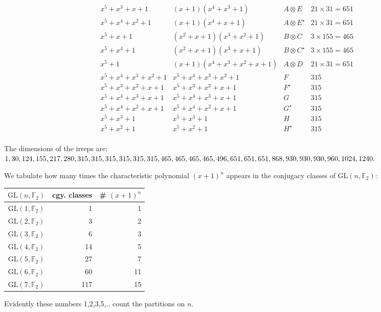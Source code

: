 \documentclass[11pt,oneside]{article}
\newcommand{\GL}{\mathrm{GL}}
\newcommand{\Field}{\mathbb{F}}
\newcommand{\tensor}{\otimes}
\begin{document}
$$\begin{array}{ccccr}
    &               x^5+x^3+x+1 &       (x+1)(x^4+x^3+1)  & A\tensor E                   &  21\times 31=651   \\
    &             x^5+x^4+x^2+1 &         (x+1)(x^4+x+1)  & A\tensor E^{\star}           &  21\times 31=651   \\
    &                   x^5+x+1 &   (x^2+x+1)(x^3+x^2+1)  & B\tensor C                   &  3\times 155=465   \\
    &                 x^5+x^4+1 &     (x^2+x+1)(x^3+x+1)  & B\tensor C^{\star}           &  3\times 155=465   \\
    &                     x^5+1 & (x+1)(x^4+x^3+x^2+x+1)  & A\tensor D                   &  21\times 31=651   \\
    &         x^5+x^4+x^3+x^2+1 &       x^5+x^4+x^3+x^2+1 & F                            & 315   \\
    &           x^5+x^3+x^2+x+1 &         x^5+x^3+x^2+x+1 & F^{\star}                    & 315   \\
    &           x^5+x^4+x^3+x+1 &         x^5+x^4+x^3+x+1 & G                            & 315   \\
    &           x^5+x^4+x^2+x+1 &         x^5+x^4+x^2+x+1 & G^{\star}                    & 315   \\
    &                 x^5+x^3+1 &               x^5+x^3+1 & H                            & 315   \\
    &                 x^5+x^2+1 &               x^5+x^2+1 & H^{\star}                    & 315   \\
\end{array}
$$

The dimensions of the irreps are:
$
1, 30, 124, 155, 217,
280, 
315, 315, 315, 315, 315, 315,\\
465, 465, 
465, 465, 
496, 
651, 651, 651, 868, 
930, 930, 930, 
960, 1024, 1240.
$

We tabulate how many times the characteristic polynomial $(x+1)^n$ appears
in the conjugacy classes of $\GL(n,\Field_2)$:
\begin{center}\begin{tabular}{c|r|r}
$\GL(n,\Field_2)$ & cgy. classes  & \# $(x+1)^n$ \\
\hline
$\GL(1,\Field_2)$  & 1    & 1 \\
$\GL(2,\Field_2)$  & 3    & 2 \\
$\GL(3,\Field_2)$  & 6   & 3 \\
$\GL(4,\Field_2)$  & 14   & 5 \\
$\GL(5,\Field_2)$  & 27   & 7 \\
$\GL(6,\Field_2)$  & 60   & 11 \\
$\GL(7,\Field_2)$  & 117   & 15 \\
\end{tabular} \end{center}
Evidently these numbers 1,2,3,5,.. count the partitions on $n$.
\end{document}
